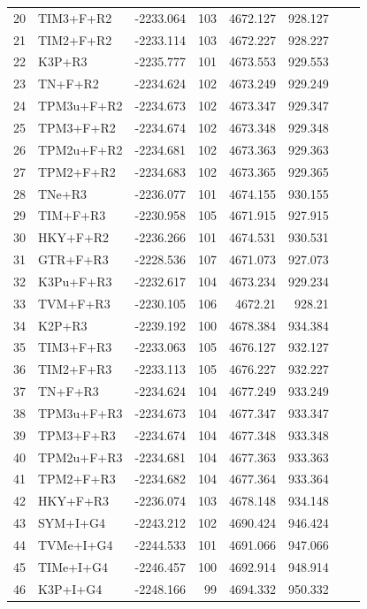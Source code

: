 \documentclass[fleqn,letterpaper]{article}
\begin{document}
\begin{longtable}{clrrrrrr}
	20 & TIM3+F+R2 & -2233.064 & 103 & 4672.127 & 928.127 \\ 
	21 & TIM2+F+R2 & -2233.114 & 103 & 4672.227 & 928.227 \\ 
	22 & K3P+R3 & -2235.777 & 101 & 4673.553 & 929.553 \\ 
	23 & TN+F+R2 & -2234.624 & 102 & 4673.249 & 929.249 \\ 
	24 & TPM3u+F+R2 & -2234.673 & 102 & 4673.347 & 929.347 \\ 
	25 & TPM3+F+R2 & -2234.674 & 102 & 4673.348 & 929.348 \\ 
	26 & TPM2u+F+R2 & -2234.681 & 102 & 4673.363 & 929.363 \\ 
	27 & TPM2+F+R2 & -2234.683 & 102 & 4673.365 & 929.365 \\ 
	28 & TNe+R3 & -2236.077 & 101 & 4674.155 & 930.155 \\ 
	29 & TIM+F+R3 & -2230.958 & 105 & 4671.915 & 927.915 \\ 
	30 & HKY+F+R2 & -2236.266 & 101 & 4674.531 & 930.531 \\ 
	31 & GTR+F+R3 & -2228.536 & 107 & 4671.073 & 927.073 \\ 
	32 & K3Pu+F+R3 & -2232.617 & 104 & 4673.234 & 929.234 \\ 
	33 & TVM+F+R3 & -2230.105 & 106 & 4672.21 & 928.21 \\ 
	34 & K2P+R3 & -2239.192 & 100 & 4678.384 & 934.384 \\ 
	35 & TIM3+F+R3 & -2233.063 & 105 & 4676.127 & 932.127 \\ 
	36 & TIM2+F+R3 & -2233.113 & 105 & 4676.227 & 932.227 \\ 
	37 & TN+F+R3 & -2234.624 & 104 & 4677.249 & 933.249 \\ 
	38 & TPM3u+F+R3 & -2234.673 & 104 & 4677.347 & 933.347 \\ 
	39 & TPM3+F+R3 & -2234.674 & 104 & 4677.348 & 933.348 \\ 
	40 & TPM2u+F+R3 & -2234.681 & 104 & 4677.363 & 933.363 \\ 
	41 & TPM2+F+R3 & -2234.682 & 104 & 4677.364 & 933.364 \\ 
	42 & HKY+F+R3 & -2236.074 & 103 & 4678.148 & 934.148 \\ 
	43 & SYM+I+G4 & -2243.212 & 102 & 4690.424 & 946.424 \\ 
	44 & TVMe+I+G4 & -2244.533 & 101 & 4691.066 & 947.066 \\ 
	45 & TIMe+I+G4 & -2246.457 & 100 & 4692.914 & 948.914 \\ 
	46 & K3P+I+G4 & -2248.166 & 99 & 4694.332 & 950.332 \\ 

\end{longtable}
\end{document}
